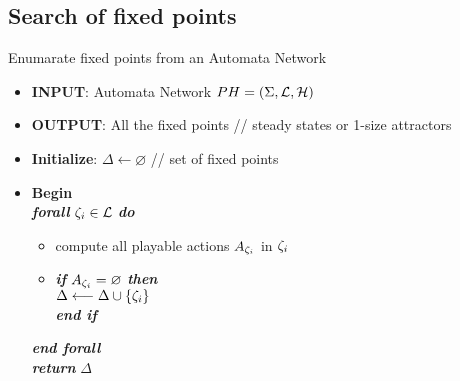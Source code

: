 \subsection{Search of fixed points}


\begin{algorithm}[h]
	\caption{Enumarate fixed points from an Automata Network}
	\label{alg:PH-fixpont}
	\begin{itemize}
		\item[] \textbf{INPUT}: Automata Network $PH=(\Sigma,\mathcal{L},\mathcal{H})$
		\item[] \textbf{OUTPUT}: All the fixed points // steady states or 1-size attractors
		\item[] \textbf{Initialize}: $\Delta \longleftarrow \varnothing$ //  set of fixed points
		\item[] \textbf{Begin} \\
		
			\hspace{0.2cm}	\textbf{\textit{forall}} $\zeta_i \in \mathcal{L}$ \textbf{\textit{do}} 
				
				\begin{itemize}
					\item[] compute all playable actions $A_{\zeta_i}$ in $\zeta_i$
					
					\item[] \textbf{\textit{if}} $A_{\zeta_i} = \varnothing$ \textbf{\textit{then}} \\
						\hspace{0.5cm}  $\Delta \longleftarrow \Delta \cup \{\zeta_i\}$ \\
					 \textbf{\textit{end if}} 
				\end{itemize}		
			\hspace{0.2cm} \textbf{\textit{end forall}} \\		
			\hspace{0.2cm} \textbf{\textit{return}} $\Delta$		
	\end{itemize}
\end{algorithm}

